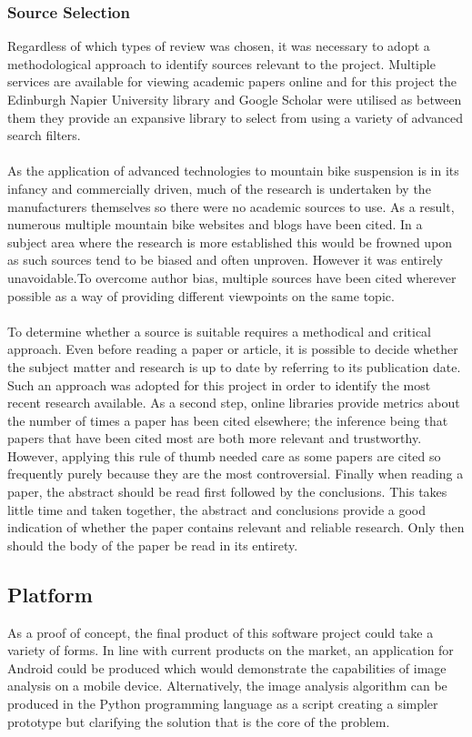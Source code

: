 		\subsubsection{Source Selection}
			Regardless of which types of review was chosen, it was necessary to adopt a methodological approach to identify sources relevant to the project. Multiple services are available for viewing academic papers online and for this project the Edinburgh Napier University library and Google Scholar were utilised as between them they provide an expansive library to select from using a variety of advanced search filters.
			\\\\
			As the  application of advanced technologies to mountain bike suspension is in its infancy and commercially driven, much of the research is undertaken by the manufacturers themselves so there were no academic sources to use. As a result, numerous multiple mountain bike websites and blogs have been cited. In a subject area where the research is more established this would be frowned upon as such sources tend to be biased and often unproven. However it was entirely unavoidable.To overcome author bias, multiple sources have been cited wherever possible as a way of providing different viewpoints on the same topic.
			\\\\
			To determine whether a source is suitable requires a methodical and critical approach. Even before reading a paper or article, it is possible to decide whether the subject matter and research is up to date by referring to its publication date. Such an approach was adopted for this project in order to identify the most recent research available. As a second step, online libraries provide metrics about the number of times a paper has been cited elsewhere; the inference being that papers that have been cited most are both more relevant and trustworthy. However, applying this rule of thumb needed care as some papers are cited so frequently purely because they are the most controversial. Finally when reading a paper, the abstract should be read first followed by the conclusions. This takes little time and taken together, the abstract and conclusions provide a good indication of whether the paper contains relevant and reliable research. Only then should the body of the paper be read in its entirety. 
	\subsection{Platform}
		As a proof of concept, the final product of this software project could take a variety of forms. In line with current products on the market, an application for Android could be produced which would demonstrate the capabilities of image analysis on a mobile device. Alternatively, the image analysis algorithm can be produced in the Python programming language as a script creating a simpler prototype but clarifying the solution that is the core of the problem.
